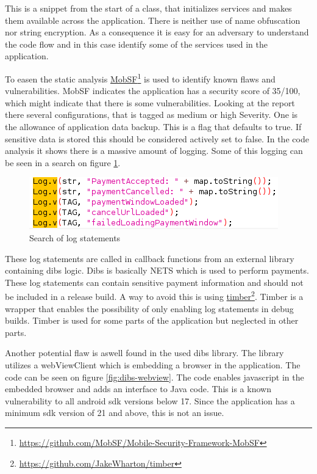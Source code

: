 This is a snippet from the start of a class, that initializes services and makes them available across the application. There is neither use of name obfuscation nor string encryption. As a consequence it is easy for an adversary to understand the code flow and in this case identify some of the services used in the application.

To easen the static analysis \href{https://github.com/MobSF/Mobile-Security-Framework-MobSF}{MobSF}\footnote{\href{https://github.com/MobSF/Mobile-Security-Framework-MobSF}{https://github.com/MobSF/Mobile-Security-Framework-MobSF}} is used to identify known flaws and vulnerabilities. MobSF indicates the application has a security score of 35/100, which might indicate that there is some vulnerabilities. Looking at the report there several configurations, that is tagged as medium or high Severity. One is the allowance of application data backup. This is a flag that defaults to true. If sensitive data is stored this should be considered actively set to false. In the code analysis it shows there is a massive amount of logging. Some of this logging can be seen in a search on figure \ref{fig:log-payments}.

\begin{figure}[htbp]
    \centering
    \includegraphics[width=1\columnwidth]{../static-analysis/pictures/log_payments.png}
    \caption{Search of log statements}
    \label{fig:log-payments}
\end{figure}

These log statements are called in callback functions from an external library containing dibs logic. Dibs is basically NETS which is used to perform payments. These log statements can contain sensitive payment information and should not be included in a release build. A way to avoid this is using \href{https://github.com/JakeWharton/timber}{timber}\footnote{\href{https://github.com/JakeWharton/timber}{https://github.com/JakeWharton/timber}}. Timber is a wrapper that enables the possibility of only enabling log statements in debug builds. Timber is used for some parts of the application but neglected in other parts.    

Another potential flaw is aswell found in the used dibs library. The library utilizes a webViewClient which is embedding a browser in the application. The code can be seen on figure \ref{fig:dibs-webview}. The code enables javascript in the embedded browser and adds an interface to Java code. This is a known vulnerability to all android sdk versions below 17\cite{avg-webview-explot}. Since the application has a minimum sdk version of 21 and above, this is not an issue.  

